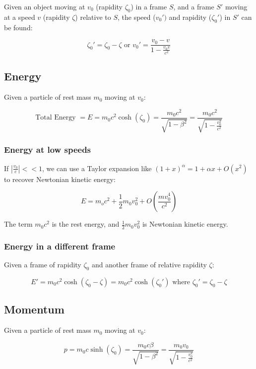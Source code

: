 \documentclass[12pt]{article}
\begin{document}
Given an object moving at $v_0$ (rapidity $\zeta_0$) in a frame $S$, and a frame $S'$ moving at a speed $v$ (rapidity $\zeta$) relative to $S$, the speed ($v_0')$ and rapidity ($\zeta_0'$) in $S'$ can be found:

\[
\boxed{
\zeta_0' = \zeta_0 - \zeta
} \text{ or } 
\boxed{
v_0' = \frac{v_0 - v}{1 - \frac{v_0 v}{c^2}}
}
\]

\newpage

\subsection{Energy}

Given a particle of rest mass $m_0$ moving at $v_0$:

\[
\boxed{
\text{Total Energy } = E = m_0 c^2 \cosh(\zeta_0) = \frac{m_0 c^2}{\sqrt{1 - \beta^2}} = \frac{m_0 c^2}{\sqrt{1 - \frac{v_0^2}{c^2}}}
}
\]

\subsubsection{Energy at low speeds}

If $\left|\frac{v_0}{c}\right| << 1$, we can use a Taylor expansion like $(1 + x)^\alpha = 1 + \alpha x + O(x^2)$ to recover Newtonian kinetic energy:

\[
\boxed{
E = m_o c^2 + \frac{1}{2}m_0 v_0^2 + O\left(\frac{mv_0^4}{c^2}\right)
}
\]

The term $m_0 c^2$ is the rest energy, and $\frac{1}{2}m_0v_0^2$ is Newtonian kinetic energy.

\subsubsection{Energy in a different frame}

Given a frame of rapidity $\zeta_0$ and another frame of relative rapidity $\zeta$:

\[
\boxed{
E' = m_0 c^2 \cosh(\zeta_0 - \zeta) = m_0 c^2 \cosh(\zeta_0')}\text{ where } \zeta_0' = \zeta_0 - \zeta
\]

\subsection{Momentum}

Given a particle of rest mass $m_0$ moving at $v_0$:

\[
\boxed{
p = m_0 c \sinh(\zeta_0) = \frac{m_0 c \beta}{\sqrt{1 - \beta^2}} = \frac{m_0 v_0}{\sqrt{1 - \frac{v_0^2}{c^2}}}
}
\]
\end{document}
